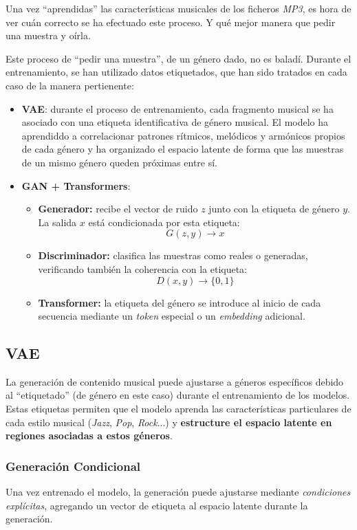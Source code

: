 Una vez ``aprendidas'' las características musicales de los ficheros \emph{MP3}, es hora de ver cuán correcto se ha efectuado este proceso. Y qué mejor manera que pedir una muestra y oírla.

Este proceso de ``pedir una muestra'', de un género dado, no es baladí. Durante el entrenamiento, se han utilizado datos etiquetados, que han sido tratados en cada caso de la manera pertienente:
\begin{itemize}
    \item \textbf{VAE}: durante el proceso de entrenamiento, cada fragmento musical se ha asociado con una etiqueta identificativa de género musical. El modelo ha aprendiddo a correlacionar patrones rítmicos, melódicos y armónicos propios de cada género y ha organizado el espacio latente de forma que las muestras de un mismo género queden próximas entre sí.
    \item \textbf{GAN + Transformers}:
    \begin{itemize}
        \item \textbf{Generador:} recibe el vector de ruido \( z \) junto con la etiqueta de género \( y \). La salida \( x \) está condicionada por esta etiqueta:
        \[
        G(z, y) \rightarrow x
        \]
        \item \textbf{Discriminador:} clasifica las muestras como reales o generadas, verificando también la coherencia con la etiqueta:
        \[
        D(x, y) \rightarrow \{0, 1\}
        \]
        \item \textbf{Transformer:} la etiqueta del género se introduce al inicio de cada secuencia mediante un \emph{token} especial o un \emph{embedding} adicional.
    \end{itemize}
\end{itemize}

\subsection{VAE}

La generación de contenido musical puede ajustarse a géneros específicos debido al ``etiquetado'' (de género en este caso) durante el entrenamiento de los modelos. Estas etiquetas permiten que el modelo aprenda las características particulares de cada estilo musical (\textit{Jazz}, \textit{Pop}, \textit{Rock}...) y \textbf{estructure el espacio latente en regiones asociadas a estos géneros}.


\subsubsection{Generación Condicional}
Una vez entrenado el modelo, la generación puede ajustarse mediante \textit{condiciones explícitas}, agregando un vector de etiqueta al espacio latente durante la generación.

